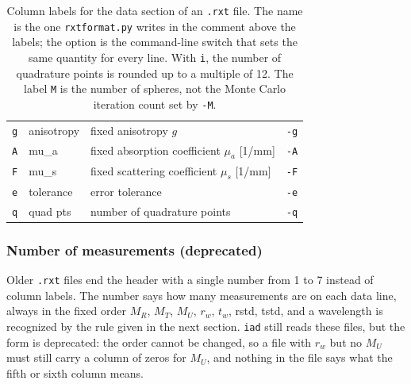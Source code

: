 \documentclass{article}
\newcommand\iadprog{\texttt{iad}}
\begin{document}
\begin{table}
\begin{tabular}{clll}
\texttt{g} & anisotropy & fixed anisotropy $g$ & \texttt{-g}\\
\texttt{A} & mu\_a & fixed absorption coefficient $\mu_a$ [1/mm] & \texttt{-A}\\
\texttt{F} & mu\_s & fixed scattering coefficient $\mu_s$ [1/mm] & \texttt{-F}\\[2mm]
\texttt{e} & tolerance & error tolerance & \texttt{-e}\\
\texttt{q} & quad pts & number of quadrature points & \texttt{-q}\\
\end{tabular}
\caption{Column labels for the data section of an \texttt{.rxt} file.  The
name is the one \texttt{rxtformat.py} writes in the comment above the labels;
the option is the command-line switch that sets the same quantity for every
line.  With \texttt{i}, the number of quadrature points is rounded up to a
multiple of 12.  The label \texttt{M} is the number of spheres, not the
Monte Carlo iteration count set by \texttt{-M}.\label{labeltable}}
\end{table}

\subsubsection{Number of measurements (deprecated)}
\label{nummeasures}

Older \texttt{.rxt} files end the header with a single number from 1 to 7
instead of column labels.  The number says how many measurements are on each
data line, always in the fixed order $M_R$, $M_T$, $M_U$, $r_w$, $t_w$, rstd,
tstd, and a wavelength is recognized by the rule given in the next section.
\iadprog{} still reads these files, but the form is deprecated: the order
cannot be changed, so a file with $r_w$ but no $M_U$ must still carry a
column of zeros for $M_U$, and nothing in the file says what the fifth or
sixth column means.
\end{document}
